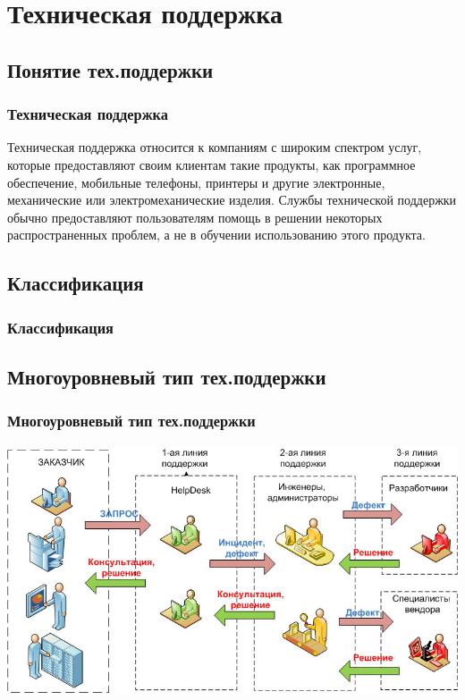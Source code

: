 \documentclass{../industrial-development}
\begin{document}
\lecturenotes


\section{Техническая поддержка}

\subsection{Понятие тех.поддержки}

\begin{frame} \frametitle{Техническая поддержка}
	\begin{definition} 
		\alert {Техническая поддержка} относится к компаниям с широким спектром услуг, которые предоставляют своим клиентам такие продукты, как программное обеспечение, мобильные телефоны, принтеры и другие электронные, механические или электромеханические изделия. Службы технической поддержки обычно предоставляют пользователям помощь в решении некоторых распространенных проблем, а не в обучении использованию этого продукта.
	\end{definition}
\end{frame}
\lecturenotes

\subsection{Классификация}
\begin{frame} \frametitle{Классификация}

\end{frame}
\lecturenotes

\subsection{Многоуровневый тип тех.поддержки}
\begin{frame} \frametitle{Многоуровневый тип тех.поддержки}
    \centerline{\includegraphics[width=\textwidth]{structure.jpg}}
\end{frame}
\end{document}
